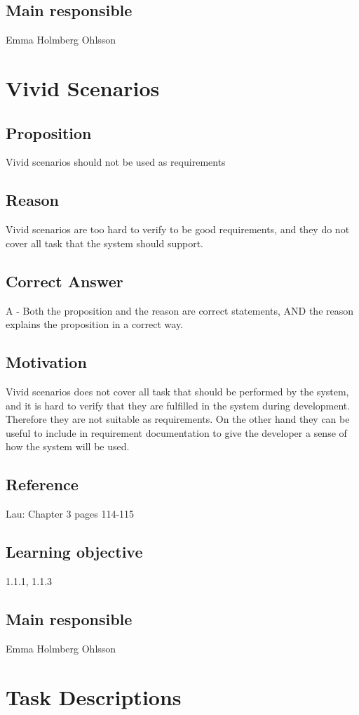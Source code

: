 \documentclass[a4paper]{article}
\begin{document}
\subsection*{Main responsible}
Emma Holmberg Ohlsson


\section{Vivid Scenarios}
\subsection*{Proposition}
Vivid scenarios should not be used as requirements
\subsection*{Reason}
Vivid scenarios are too hard to verify to be good requirements, and they do not cover all task that the system should support.
\subsection*{Correct Answer}
A - Both the proposition and the reason are correct statements, AND the reason explains the proposition in a correct way.
\subsection*{Motivation}
Vivid scenarios does not cover all task that should be performed by the system, and it is hard to verify that they are fulfilled in the system during development. Therefore they are not suitable as requirements. On the other hand they can be useful to include in requirement documentation to give the developer a sense of how the system will be used.
\subsection*{Reference}
Lau: Chapter 3 pages 114-115
\subsection*{Learning objective}
1.1.1, 1.1.3
\subsection*{Main responsible}
Emma Holmberg Ohlsson


\section{Task Descriptions}
\end{document}
